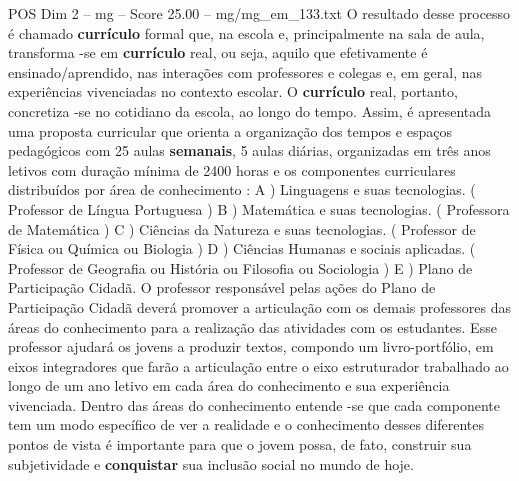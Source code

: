 \begin{textsample}{POS Dim 2 – mg – Score 25.00 – mg/mg\_em\_133.txt}
O resultado desse processo é chamado \textbf{currículo} formal que, na escola e, principalmente na sala de aula, transforma -se em \textbf{currículo} real, ou seja, aquilo que efetivamente é ensinado/aprendido, nas interações com professores e colegas e, em geral, nas experiências vivenciadas no contexto escolar.
O \textbf{currículo} real, portanto, concretiza -se no cotidiano da escola, ao longo do tempo.
Assim, é apresentada uma proposta curricular que orienta a organização dos tempos e espaços pedagógicos com 25 aulas \textbf{semanais}, 5 aulas diárias, organizadas em três anos letivos com duração mínima de 2400 horas e os componentes curriculares distribuídos por área de conhecimento : A ) Linguagens e suas tecnologias. ( Professor de Língua Portuguesa ) B ) Matemática e suas tecnologias. ( Professora de Matemática ) C ) Ciências da Natureza e suas tecnologias. ( Professor de Física ou Química ou Biologia ) D ) Ciências Humanas e sociais aplicadas. ( Professor de Geografia ou História ou Filosofia ou Sociologia ) E ) Plano de Participação Cidadã.
O professor responsável pelas ações do Plano de Participação Cidadã deverá promover a articulação com os demais professores das áreas do conhecimento para a realização das atividades com os estudantes.
Esse professor ajudará os jovens a produzir textos, compondo um livro-portfólio, em eixos integradores que farão a articulação entre o eixo estruturador trabalhado ao longo de um ano letivo em cada área do conhecimento e sua experiência vivenciada.
Dentro das áreas do conhecimento entende -se que cada componente tem um modo específico de ver a realidade e o conhecimento desses diferentes pontos de vista é importante para que o jovem possa, de fato, construir sua subjetividade e \textbf{conquistar} sua inclusão social no mundo de hoje.

\end{textsample}
